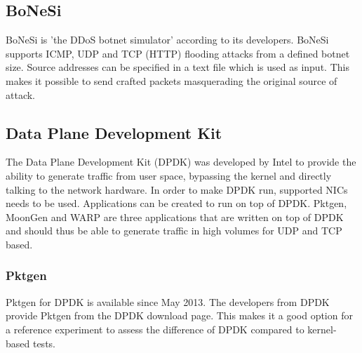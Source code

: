 \subsection{BoNeSi}\label{sub:bonesi}
BoNeSi is 'the DDoS botnet simulator' according to its developers. BoNeSi supports ICMP, UDP and TCP (HTTP) flooding attacks from a defined botnet size. Source addresses can be specified in a text file which is used as input. This makes it possible to send crafted packets masquerading the original source of attack.  


\subsection{Data Plane Development Kit}\label{sub:dpdk}
The Data Plane Development Kit\cite{dpdk} (DPDK) was developed by Intel to provide the ability to generate traffic from user space, bypassing the kernel and directly talking to the network hardware. In order to make DPDK run, supported NICs \cite{dpdknic} needs to be used. Applications can be created to run on top of DPDK. Pktgen, MoonGen and WARP are three applications that are written on top of DPDK and should thus be able to generate traffic in high volumes for UDP and TCP based. 

\subsubsection{Pktgen}\label{subsub:dpdk-pktgen}
Pktgen for DPDK is available since May 2013. The developers from DPDK provide Pktgen from the DPDK download page. This makes it a good option for a reference experiment to assess the difference of DPDK compared to kernel-based tests. 

